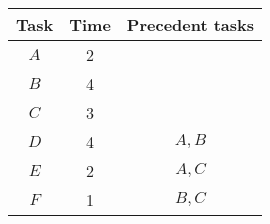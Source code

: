 \documentclass{standalone}
\begin{document}
    \begin{tabular}{ccc}\toprule
        Task&Time&Precedent tasks\\\midrule
        $A$&2&\\
        $B$&4&\\
        $C$&3&\\
        $D$&4&$A,B$\\
        $E$&2&$A,C$\\
        $F$&1&$B,C$\\
   \bottomrule
    \end{tabular}
\end{document}
